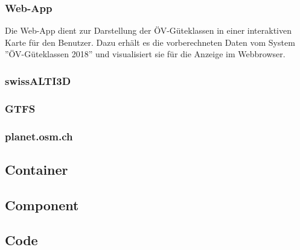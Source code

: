\subsubsection{Web-App}
\label{subsystem:Web-App}

Die Web-App dient zur Darstellung der ÖV-Güteklassen in einer interaktiven Karte für den Benutzer. Dazu erhält es die vorberechneten Daten vom System ''ÖV-Güteklassen 2018'' und visualisiert sie für die Anzeige im Webbrowser.

\subsubsection{swissALTI3D}
\label{subsystem:swissALTI3D}



\subsubsection{GTFS}
\label{subsystem:GTFS}

\subsubsection{planet.osm.ch}
\label{subsystem:planet.osm.ch}



\subsection{Container}
\label{Architektur:Container}



\subsection{Component}
\label{Architektur:Component}


\subsection{Code}
\label{Architektur:Code}

